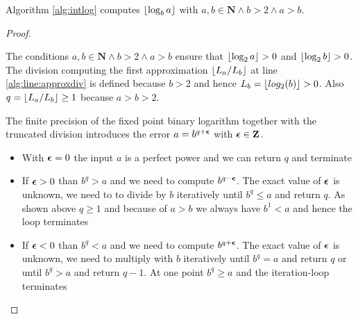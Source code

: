 \begin{thm}\label{thm:logba}
Algorithm \ref{alg:intlog} computes $\left\lfloor\log_b a\right\rfloor$ with $a,b \in\mathbf{N} \wedge b > 2 \wedge a > b$.
\end{thm}
\begin{proof}\label{proof:logba}
\begin{proofsec}\label{proofsec:approximationdefined}
The conditions $a,b \in\mathbf{N} \wedge b > 2 \wedge a > b$ ensure that $\left\lfloor\log_2 a\right\rfloor > 0$ and $\left\lfloor\log_2 b\right\rfloor > 0$. The division
computing the first approximation $\left\lfloor L_a / L_b\right\rfloor$ at line \ref{alg:line:approxdiv} is defined because $b > 2$ and 
hence $L_b = \left\lfloor log_2(b)\right\rfloor > 0$. Also $q=\left\lfloor L_a / L_b\right\rfloor \ge 1$ because $a > b > 2$.
\end{proofsec}
\begin{proofsec}\label{proofsec:termination}
The finite precision of the fixed point binary logarithm together with the truncated division
introduces the error $a = b^{q + \boldsymbol{\epsilon}}$ with $\boldsymbol{\epsilon} \in\mathbf{Z}$.
\begin{itemize}
\item{With $\boldsymbol{\epsilon} = 0$ the input $a$ is a perfect power and we can return $q$ and terminate}
\item{If $\boldsymbol{\epsilon} > 0$ than $b^q > a$ and we need to compute $b^{q - \boldsymbol{\epsilon}}$. The exact value of $\boldsymbol{\epsilon}$ is unknown,
       we need to to divide by $b$ iteratively until $b^q \le a$ and return $q$.
       As shown above $q \ge 1$ and because of $a > b$ we always have $b^1 < a$ and hence the loop terminates}
\item{If $\boldsymbol{\epsilon} < 0$ than $b^q < a$ and we need to compute $b^{q + \boldsymbol{\epsilon}}$. The exact value of $\boldsymbol{\epsilon}$ is unknown,
      we need to multiply with $b$ iteratively until $b^q = a$ and return $q$ or until $b^q > a$ and return $q - 1$.
      At one point $b^q \ge a$ and the iteration-loop terminates}
\end{itemize}
\end{proofsec}
\end{proof}

